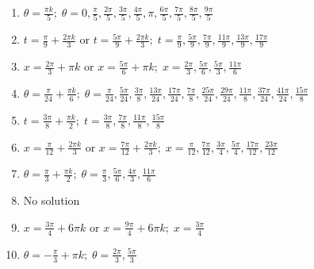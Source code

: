 \documentclass{ximera}
\begin{document}
	\author{Stitz-Zeager}


\begin{enumerate}

\item $\theta = \frac{\pi k}{5}; \; \theta = 0, \frac{\pi}{5}, \frac{2\pi}{5}, \frac{3\pi}{5}, \frac{4\pi}{5}, \pi, \frac{6\pi}{5}, \frac{7\pi}{5}, \frac{8\pi}{5}, \frac{9\pi}{5}$

\item $t  = \frac{\pi}{9} + \frac{2\pi k}{3}$ or $t = \frac{5\pi}{9} + \frac{2\pi k}{3}; \; t = \frac{\pi}{9}, \frac{5\pi}{9}, \frac{7\pi}{9}, \frac{11\pi}{9}, \frac{13\pi}{9}, \frac{17\pi}{9}$

\item $x = \frac{2\pi}{3} + \pi k$ or $x = \frac{5\pi}{6} + \pi k; \; x = \frac{2\pi}{3}, \frac{5\pi}{6}, \frac{5\pi}{3}, \frac{11\pi}{6}$

\item $\theta = \frac{\pi}{24} + \frac{\pi k}{6}; \; \theta = \frac{\pi}{24}, \frac{5\pi}{24}, \frac{3\pi}{8}, \frac{13\pi}{24}, \frac{17\pi}{24}, \frac{7\pi}{8}, \frac{25\pi}{24}, \frac{29\pi}{24}, \frac{11\pi}{8}, \frac{37\pi}{24}, \frac{41\pi}{24}, \frac{15\pi}{8}$

\item $t = \frac{3\pi}{8} + \frac{\pi k}{2}; \; t = \frac{3\pi}{8}, \frac{7\pi}{8}, \frac{11\pi}{8}, \frac{15\pi}{8}$

\item $x = \frac{\pi}{12} + \frac{2\pi k}{3}$ or $x = \frac{7\pi}{12} + \frac{2\pi k}{3}; \; x = \frac{\pi}{12}, \frac{7\pi}{12}, \frac{3\pi}{4}, \frac{5\pi}{4}, \frac{17\pi}{12}, \frac{23\pi}{12}$

\item $\theta  = \frac{\pi}{3} + \frac{\pi k}{2}; \; \theta  = \frac{\pi}{3}, \frac{5\pi}{6}, \frac{4\pi}{3}, \frac{11\pi}{6}$

\item No solution

\item $x = \frac{3\pi}{4} + 6\pi k$ or $x = \frac{9\pi}{4} + 6\pi k; \; x = \frac{3\pi}{4}$

\item $\theta = -\frac{\pi}{3} + \pi k; \; \theta  = \frac{2\pi}{3}, \frac{5\pi}{3}$


\end{enumerate}
\end{document}
